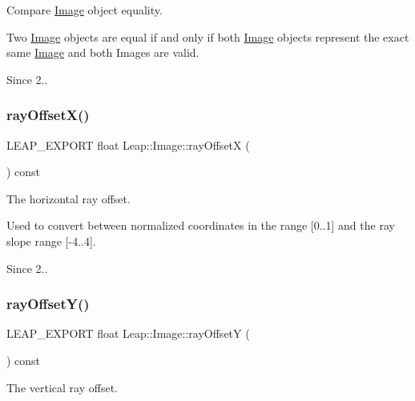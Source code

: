 Compare \hyperlink{class_leap_1_1_image}{Image} object equality.

Two \hyperlink{class_leap_1_1_image}{Image} objects are equal if and only if both \hyperlink{class_leap_1_1_image}{Image} objects represent the exact same \hyperlink{class_leap_1_1_image}{Image} and both Images are valid. \begin{DoxySince}{Since}
2.. 
\end{DoxySince}
\mbox{\label{class_leap_1_1_image_ae07452257740b6050bf74cb835dc7f9a}} 
\subsubsection{\texorpdfstring{ray\+Offset\+X()}{rayOffsetX()}}
{\footnotesize\ttfamily L\+E\+A\+P\+\_\+\+E\+X\+P\+O\+RT float Leap\+::\+Image\+::ray\+OffsetX (\begin{DoxyParamCaption}{ }\end{DoxyParamCaption}) const}

The horizontal ray offset.

Used to convert between normalized coordinates in the range \mbox{[}0..1\mbox{]} and the ray slope range \mbox{[}-\/4..4\mbox{]}.


\begin{DoxyCodeInclude}
\end{DoxyCodeInclude}


\begin{DoxySince}{Since}
2.. 
\end{DoxySince}
\mbox{\label{class_leap_1_1_image_a7ae5ea2e7bcb151d50ad5ca03b1c3a37}} 
\subsubsection{\texorpdfstring{ray\+Offset\+Y()}{rayOffsetY()}}
{\footnotesize\ttfamily L\+E\+A\+P\+\_\+\+E\+X\+P\+O\+RT float Leap\+::\+Image\+::ray\+OffsetY (\begin{DoxyParamCaption}{ }\end{DoxyParamCaption}) const}

The vertical ray offset.

